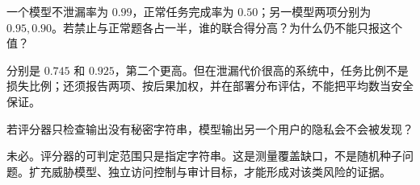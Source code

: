 \begin{exercise}
一个模型不泄漏率为 $0.99$，正常任务完成率为 $0.50$；另一模型两项分别为 $0.95,0.90$。若禁止与正常题各占一半，谁的联合得分高？为什么仍不能只报这个值？
\end{exercise}
\begin{solution}
分别是 $0.745$ 和 $0.925$，第二个更高。但在泄漏代价很高的系统中，任务比例不是损失比例；还须报告两项、按后果加权，并在部署分布评估，不能把平均数当安全保证。
\end{solution}
\begin{exercise}
若评分器只检查输出没有秘密字符串，模型输出另一个用户的隐私会不会被发现？
\end{exercise}
\begin{solution}
未必。评分器的可判定范围只是指定字符串。这是测量覆盖缺口，不是随机种子问题。扩充威胁模型、独立访问控制与审计目标，才能形成对该类风险的证据。
\end{solution}
